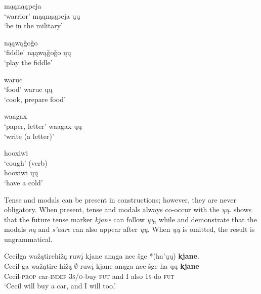 \documentclass[output=paper]{LSP/langsci}
\begin{document}
\ea\label{ex:johnson:14}
\begin{multicols}{2}
\ea 
mąąnąąpeja\\
`warrior'
\ex 
mąąnąąpeja ųų\\
`be in the military'
\z
\end{multicols}
\z
 
\ea\label{ex:johnson:15}
\begin{multicols}{2}
\ea 
nąąwą\v{g}o\v{g}o\\
`fiddle'
\ex 
nąąwą\v{g}o\v{g}o ųų\\
`play the fiddle'
\z
\end{multicols}
\z
 
\ea\label{ex:johnson:16}
\begin{multicols}{2}
\ea 
waruc\\
`food'
\ex 
waruc ųų\\
`cook, prepare food'
\z
\end{multicols}
\z
 
\ea\label{ex:johnson:17}
\begin{multicols}{2}
\ea 
waagax\\
`paper, letter'
\ex 
waagax ųų\\
`write (a letter)'
\z
\end{multicols}
\z
 
\ea\label{ex:johnson:18}
\begin{multicols}{2}
\ea 
hooxiwi\\
`cough' (verb)\\

\ex 
hooxiwi ųų\\
`have a cold'
\z
\end{multicols}
\z

Tense and modals can be present in  constructions; however, they are never obligatory. When present, tense and modals always co-occur with the  \emph{ųų}.  shows that the future tense marker \emph{kjane} can follow \emph{ųų}, while  and  demonstrate that the modals \emph{ną} and \emph{s'aare} can also appear after \emph{ųų}. When \emph{ųų} is omitted, the result is ungrammatical.
 
\ea\label{ex:johnson:19}
\ea\label{ex:johnson:19a} 
\glll Cecilga wažątirehižą ruwį kjane anąga nee šge *(ha'ųų) \textbf{kjane}.\\
Cecil-ga wažątire-hižą $\emptyset$-ruwį kjane anąga nee šge ha-ųų \textbf{kjane}\\
Cecil-\textsc{prop} car-\textsc{indef} \textsc{3s/o}-buy \textsc{fut} and I also \textsc{1s}-do \textsc{fut}\\
\trans `Cecil will buy a car, and I will too.' 
 
\end{document}
